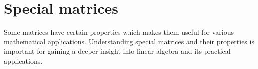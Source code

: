 \documentclass[letterpaper,10pt,english]{jupyterBook}
\begin{document}
\sphinxstepscope

\ignorespaces 

\section{Special matrices}
\label{\detokenize{_pages/1.3_Special_matrices:special-matrices}}\label{\detokenize{_pages/1.3_Special_matrices:index-0}}\label{\detokenize{_pages/1.3_Special_matrices::doc}}
\sphinxAtStartPar
Some matrices have certain properties which makes them useful for various mathematical applications. Understanding special matrices and their properties is important for gaining a deeper insight into linear algebra and its practical applications.

\ignorespaces 
\end{document}
